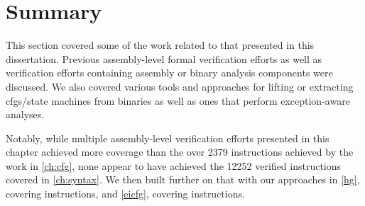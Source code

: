 \section{Summary}
This section covered some of the work related to that presented in this dissertation.
Previous assembly-level
formal verification efforts
as well as verification efforts containing assembly or binary analysis components were discussed.
We also covered various tools and approaches for lifting or extracting \acp{cfg}/state machines from binaries as well as ones that perform exception-aware analyses.

Notably, while multiple assembly-level verification efforts
presented in this chapter achieved more coverage
than the over \num{2379} instructions achieved by the work in \cref{ch:cfg},
none appear to have achieved the \num{12252}
verified instructions covered in \cref{ch:syntax}.
We then built further on that with our approaches in \cref{hg}, covering  instructions, and \cref{eicfg}, covering  instructions.
